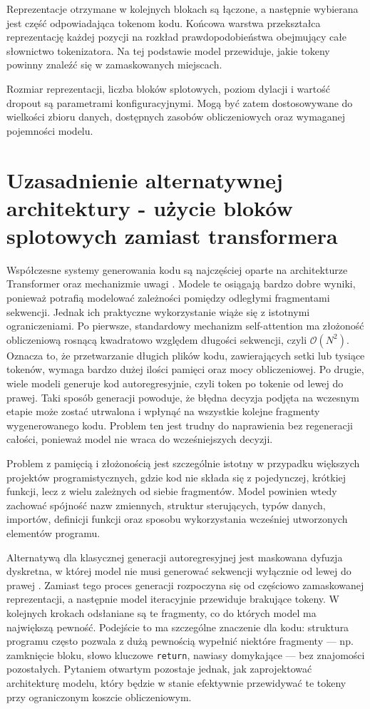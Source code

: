 Reprezentacje otrzymane w kolejnych blokach są łączone, a następnie wybierana jest część odpowiadająca tokenom kodu. Końcowa warstwa przekształca reprezentację każdej pozycji na rozkład prawdopodobieństwa obejmujący całe słownictwo tokenizatora. Na tej podstawie model przewiduje, jakie tokeny powinny znaleźć się w zamaskowanych miejscach.

Rozmiar reprezentacji, liczba bloków splotowych, poziom dylacji i wartość dropout są parametrami konfiguracyjnymi. Mogą być zatem dostosowywane do wielkości zbioru danych, dostępnych zasobów obliczeniowych oraz wymaganej pojemności modelu.


\section{Uzasadnienie alternatywnej architektury - użycie bloków splotowych zamiast transformera}
\label{sec:uzasadnienie_architektury}

Współczesne systemy generowania kodu są najczęściej oparte na architekturze Transformer oraz mechanizmie uwagi \cite{vaswani2017attention, chen2021evaluating}. Modele te osiągają bardzo dobre wyniki, ponieważ potrafią modelować zależności pomiędzy odległymi fragmentami sekwencji. Jednak ich praktyczne wykorzystanie wiąże się z istotnymi ograniczeniami. Po pierwsze, standardowy mechanizm self-attention ma złożoność obliczeniową rosnącą kwadratowo względem długości sekwencji, czyli $\mathcal{O}(N^2)$. Oznacza to, że przetwarzanie długich plików kodu, zawierających setki lub tysiące tokenów, wymaga bardzo dużej ilości pamięci oraz mocy obliczeniowej. Po drugie, wiele modeli generuje kod autoregresyjnie, czyli token po tokenie od lewej do prawej. Taki sposób generacji powoduje, że błędna decyzja podjęta na wczesnym etapie może zostać utrwalona i wpłynąć na wszystkie kolejne fragmenty wygenerowanego kodu. Problem ten jest trudny do naprawienia bez regeneracji całości, ponieważ model nie wraca do wcześniejszych decyzji.

Problem z pamięcią i złożonością jest szczególnie istotny w przypadku większych projektów programistycznych, gdzie kod nie składa się z pojedynczej, krótkiej funkcji, lecz z wielu zależnych od siebie fragmentów. Model powinien wtedy zachować spójność nazw zmiennych, struktur sterujących, typów danych, importów, definicji funkcji oraz sposobu wykorzystania wcześniej utworzonych elementów programu.

Alternatywą dla klasycznej generacji autoregresyjnej jest maskowana dyfuzja dyskretna, w której model nie musi generować sekwencji wyłącznie od lewej do prawej \cite{austin2021structured, chang2022maskgit}. Zamiast tego proces generacji rozpoczyna się od częściowo zamaskowanej reprezentacji, a następnie model iteracyjnie przewiduje brakujące tokeny. W kolejnych krokach odsłaniane są te fragmenty, co do których model ma największą pewność. Podejście to ma szczególne znaczenie dla kodu: struktura programu często pozwala z dużą pewnością wypełnić niektóre fragmenty — np. zamknięcie bloku, słowo kluczowe \texttt{return}, nawiasy domykające — bez znajomości pozostałych. Pytaniem otwartym pozostaje jednak, jak zaprojektować architekturę modelu, który będzie w stanie efektywnie przewidywać te tokeny przy ograniczonym koszcie obliczeniowym.

